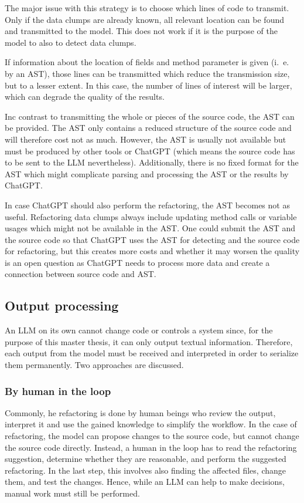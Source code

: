 The major issue with this strategy is to choose which lines of code to transmit. Only if the data clumps are already known, all relevant location can be found and transmitted to the model. This does not work if it is the purpose of the model to also to detect data clumps. 

If information about the location of fields and method parameter is given (i.~e. by an \ac{AST}), those lines can be transmitted which reduce the transmission size, but to a lesser extent. In this case, the number of lines of interest will be larger, which can degrade the quality of the results. 

Inc contrast to transmitting the whole or pieces of the source code, the \ac{AST} can be provided. The \ac{AST} only contains a reduced structure of the source code and will therefore cost not as much. However, the \ac{AST} is usually not available but must be produced by other tools or ChatGPT (which means the source code has to be sent to the \ac{LLM} nevertheless). Additionally, there is no fixed format for the \ac{AST} which might complicate parsing and processing the \ac{AST} or the results by ChatGPT.


In case ChatGPT should also perform the refactoring, the \ac{AST} becomes not as useful. Refactoring data clumps always include updating method calls or variable usages which might not be available in the \ac{AST}. One could submit the \ac{AST} and the source code so that ChatGPT uses the \ac{AST} for detecting and the source code for refactoring, but this creates more costs and whether it may worsen the quality is an open question as ChatGPT needs to process more data and create a connection between source code and \ac{AST}.


\subsection{Output processing}
An \ac{LLM} on its own cannot change code or controls a system since, for the purpose of this master thesis, it  can only output textual information. Therefore, each output from the model must be received and interpreted  in order to serialize them permanently. Two approaches are discussed. 

\subsubsection{By human in the loop}
Commonly, he refactoring is done by human beings who review the output, interpret it and use the gained knowledge to simplify the workflow. In the case of refactoring, the model can propose changes to the source code, but cannot change the source code directly. Instead, a human in the loop has to read the refactoring suggestion, determine whether they are reasonable, and perform the suggested refactoring. In the last step, this involves also finding the affected files, change them, and test the changes. Hence, while an \ac{LLM} can help to make decisions, manual work must still be performed. 

